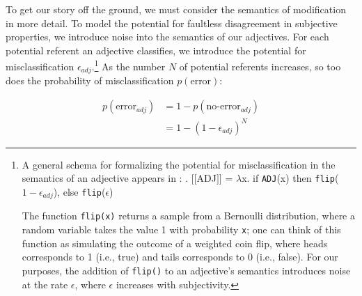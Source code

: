 \documentclass[preprint,authoryear]{elsarticle}\frenchspacing
\newcommand{\gcs}[1]{\textcolor{blue}{[gcs: #1]}}
\newcommand{\sem}[1]{\mbox{$[\![$#1$]\!]$}}
\newcommand{\lam}{\ensuremath{\lambda}}
\begin{document}
To get our story off the ground, we must consider the semantics of modification in more detail. To model the potential for faultless disagreement in subjective properties, we introduce noise into the semantics of our adjectives. 
%
%
For each potential referent an adjective classifies, we introduce the potential for misclassification $\epsilon_{adj}$.\footnote{A general schema for formalizing the potential for misclassification in the semantics of an adjective appears in \Next: 
	\ex. \sem{ADJ} = \lam x. if \texttt{ADJ}(x) then \texttt{flip}($1-\epsilon_{adj}$), else \texttt{flip}($\epsilon$)
	
The function \texttt{flip(x)} returns a sample from a Bernoulli distribution, where a random variable takes the value 1 with probability \texttt{x}; one can think of this function as simulating the outcome of a weighted coin flip, where heads corresponds to 1 (i.e., true) and tails corresponds to 0 (i.e., false). For our purposes, the addition of \texttt{flip()} to an adjective's semantics introduces noise at the rate $\epsilon$, where $\epsilon$ increases with subjectivity.} 
As the number $N$ of potential referents increases, so too does the probability of misclassification $p(\textrm{error})$: 

\setcounter{equation}{3}
\begin{align}
p(\textrm{error}_{adj}) &= 1 - p(\textrm{no-error}_{adj}) \nonumber\\
&= 1 - (1-\epsilon_{adj})^N
\end{align}
\end{document}
